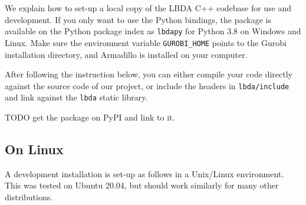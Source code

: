 \documentclass[12pt, english]{article}
\begin{document}
We explain how to set-up a local copy of the LBDA C++ codebase for use and development. If you only want to use the Python bindings, the package is available on the Python package index as \texttt{lbdapy} for Python 3.8 on Windows and Linux. Make sure the environment variable \texttt{GUROBI\_HOME} points to the Gurobi installation directory, and Armadillo is installed on your computer. 

After following the instruction below, you can either compile your code directly against the source code of our project, or include the headers in \texttt{lbda/include} and link against the \texttt{lbda} static library.

TODO get the package on PyPI and link to it.

\subsection{On Linux}
A development installation is set-up as follows in a Unix/Linux environment. This was tested on Ubuntu 20.04, but should work similarly for many other distributions.
\end{document}
